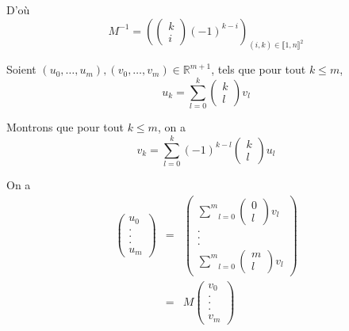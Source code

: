 D'o{\`u}
\[ M^{- 1} = \left( \left( \begin{array}{c}
     k\\
     i
   \end{array} \right) (- 1)^{k - i} \right)_{(i, k) \in \llbracket 1, n
   \rrbracket^2} \]


 Soient $(u_0, \ldots, u_m), (v_0, \ldots, v_m) \in
\mathbb{R}^{m + 1}$, tels que pour tout $k \leqslant m$,
\[ u_k = \underset{l = 0}{\overset{k}{\sum}} \left( \begin{array}{c}
     k\\
     l
   \end{array} \right) v_l \]


Montrons que pour tout $k \leqslant m$, on a
\[ v_k = \underset{l = 0}{\overset{k}{\sum}} (- 1)^{k - l} \left(
   \begin{array}{c}
     k\\
     l
   \end{array} \right) u_l \]


On a
\begin{eqnarray*}
  \left( \begin{array}{c}
    u_0\\
    .\\
    .\\
    .\\
    u_m
  \end{array} \right) & = & \left( \begin{array}{c}
    \underset{l = 0}{\overset{m}{\sum}} \left( \begin{array}{c}
      0\\
      l
    \end{array} \right) v_l\\
    .\\
    .\\
    .\\
    \underset{l = 0}{\overset{m}{\sum}} \left( \begin{array}{c}
      m\\
      l
    \end{array} \right) v_l
  \end{array} \right)\\
  & = & M \left( \begin{array}{c}
    v_0\\
    .\\
    .\\
    .\\
    v_m
  \end{array} \right)
\end{eqnarray*}


